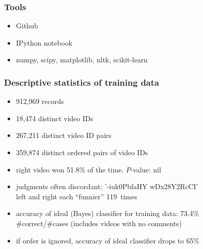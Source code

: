 \documentclass[fleqn]{beamer}
\begin{document}
\begin{frame}
\frametitle{Tools}
   \begin{itemize}
        \item Github
        \item IPython notebook
        \item numpy, scipy, matplotlib, nltk, scikit-learn
   \end{itemize}

\end{frame}

 \begin{frame}
\frametitle{Descriptive statistics of training data}
      \begin{itemize}
         \item 912,969 records
         \item 18,474 distinct video IDs
         \item 267,211 distinct video ID pairs
         \item 359,874 distinct ordered pairs of video IDs
         \item right video won 51.8\% of the time. $P$-value: nil
         \item judgments often discordant: 
                  '-iuk0PbfaHY wDx28Y2RcCI' \\
                  left and right each ``funnier'' 119~times
         \item accuracy of ideal (Bayes) classifier for training data: 73.4\% \\
                  \#correct/\#cases (includes videos with no comments)
         \item if order is ignored,  accuracy of ideal classifier drops to 65\%
     \end{itemize}

\end{frame}
\end{document}
